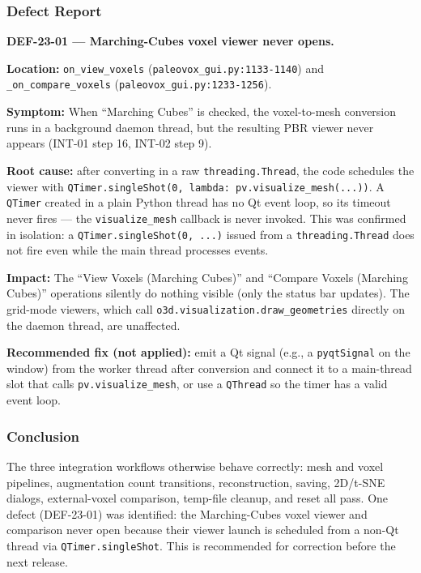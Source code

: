 \documentclass[12pt,a4paper]{article}
\begin{document}
\subsubsection{Defect Report}

\textbf{DEF-23-01 --- Marching-Cubes voxel viewer never opens.}

\textbf{Location:} \texttt{on\_view\_voxels} (\texttt{paleovox\_gui.py:1133-1140})
and \texttt{\_on\_compare\_voxels} (\texttt{paleovox\_gui.py:1233-1256}).

\textbf{Symptom:} When ``Marching Cubes'' is checked, the voxel-to-mesh
conversion runs in a background daemon thread, but the resulting PBR viewer
never appears (INT-01 step 16, INT-02 step 9).

\textbf{Root cause:} after converting in a raw \texttt{threading.Thread}, the
code schedules the viewer with
\texttt{QTimer.singleShot(0, lambda: pv.visualize\_mesh(...))}. A
\texttt{QTimer} created in a plain Python thread has no Qt event loop, so its
timeout never fires --- the \texttt{visualize\_mesh} callback is never invoked.
This was confirmed in isolation: a \texttt{QTimer.singleShot(0, ...)} issued
from a \texttt{threading.Thread} does not fire even while the main thread
processes events.

\textbf{Impact:} The ``View Voxels (Marching Cubes)'' and ``Compare Voxels
(Marching Cubes)'' operations silently do nothing visible (only the status bar
updates). The grid-mode viewers, which call
\texttt{o3d.visualization.draw\_geometries} directly on the daemon thread, are
unaffected.

\textbf{Recommended fix (not applied):} emit a Qt signal (e.g., a
\texttt{pyqtSignal} on the window) from the worker thread after conversion and
connect it to a main-thread slot that calls \texttt{pv.visualize\_mesh}, or use
a \texttt{QThread} so the timer has a valid event loop.

\subsubsection{Conclusion}

The three integration workflows otherwise behave correctly: mesh and voxel
pipelines, augmentation count transitions, reconstruction, saving, 2D/t-SNE
dialogs, external-voxel comparison, temp-file cleanup, and reset all pass.
One defect (DEF-23-01) was identified: the Marching-Cubes voxel viewer and
comparison never open because their viewer launch is scheduled from a non-Qt
thread via \texttt{QTimer.singleShot}. This is recommended for correction
before the next release.
\end{document}
